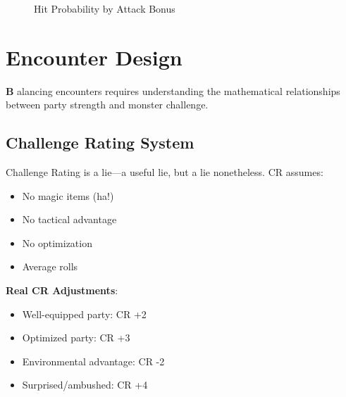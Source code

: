 \documentclass[11pt,letterpaper,openany]{book}
\newcommand{\firstletter}[1]{%
    \textcolor{bloodred}{\fontsize{48}{48}\selectfont\bfseries #1}%
}
\begin{document}
\begin{figure}[h]
\centering
{}
\caption{Hit Probability by Attack Bonus}
\end{figure}

\chapter{Encounter Design}

\firstletter{B}alancing encounters requires understanding the mathematical relationships between party strength and monster challenge.

\section{Challenge Rating System}

Challenge Rating is a lie—a useful lie, but a lie nonetheless. CR assumes:
\begin{itemize}
    \item No magic items (ha!)
    \item No tactical advantage
    \item No optimization
    \item Average rolls
\end{itemize}

\textbf{Real CR Adjustments}:
\begin{itemize}
    \item Well-equipped party: CR +2
    \item Optimized party: CR +3
    \item Environmental advantage: CR -2
    \item Surprised/ambushed: CR +4
\end{itemize}
\end{document}
